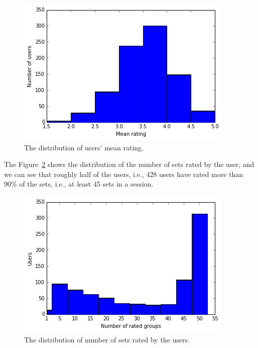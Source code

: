 \begin{figure}[ht]
  \includegraphics[scale=0.65]{figures/meanratingdist.png}
  \caption{The distribution of users' mean rating.}
  \label{fig:meanratingdist}
\end{figure}



The Figure~\ref{fig:usersetdist} shows the distribution of the number of sets rated by the user,
and we can see that roughly half of the users, i.e., 428 users have rated more
than 90\% of the sets, i.e., at least 45 sets in a session.

\begin{figure}[ht]
  \includegraphics[scale=0.65]{figures/usersetdist.png}
  \caption{The distribution of number of sets rated by the users.}
  \label{fig:usersetdist}
\end{figure}

